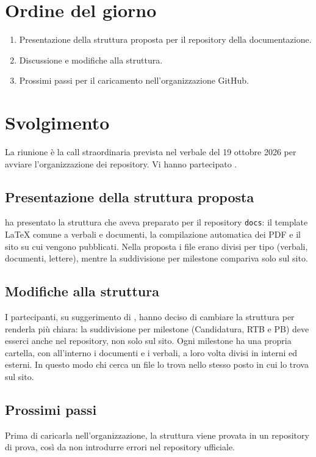 \documentclass[verbale=interno]{gpt}
\begin{document}
\section{Ordine del giorno}
\begin{enumerate}
  \item Presentazione della struttura proposta per il repository della
    documentazione.
  \item Discussione e modifiche alla struttura.
  \item Prossimi passi per il caricamento nell'organizzazione GitHub.
\end{enumerate}

\section{Svolgimento}

La riunione è la call straordinaria prevista nel verbale del 19 ottobre
2026 per avviare l'organizzazione dei repository. Vi hanno partecipato
.

\subsection{Presentazione della struttura proposta}
 ha presentato la struttura che aveva preparato per il
repository \texttt{docs}: il template \LaTeX{} comune a verbali e
documenti, la compilazione automatica dei PDF e il sito su cui vengono
pubblicati. Nella proposta i file erano divisi per tipo (verbali,
documenti, lettere), mentre la suddivisione per milestone compariva solo
sul sito.

\subsection{Modifiche alla struttura}
I partecipanti, su suggerimento di , hanno deciso di cambiare la struttura per renderla più
chiara: la suddivisione per milestone (Candidatura, RTB e PB) deve
esserci anche nel repository, non solo sul sito. Ogni milestone ha una
propria cartella, con all'interno i documenti e i verbali, a loro volta
divisi in interni ed esterni. In questo modo chi cerca un file lo trova
nello stesso posto in cui lo trova sul sito.

\subsection{Prossimi passi}
Prima di caricarla nell'organizzazione, la struttura viene provata in un
repository di prova, così da non introdurre errori nel repository
ufficiale.
\end{document}
